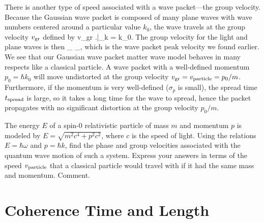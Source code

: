 There is another type of speed associated with a wave packet---the group velocity.  Because the Gaussian wave packet is composed of many plane waves with wave numbers centered around a particular value $k_{0}$, the wave travels at the group velocity $v_{\rm gr}$ defined by
%
\beq
v_{\rm gr} \equiv \left.\right|_{k = k_{0}}.
\label{group velocity}
\eeq
%
The group velocity for the light and plane waves is then
%
\beq
{}_{\displaystyle {}} \phantom{space} \longleftrightarrow  \phantom{space} _{\displaystyle {}},
\label{light matter group v}
\eeq
%
%
which is the wave packet peak velocity we found earlier. We see that our Gaussian wave packet matter wave model behaves in many respects like a classical particle.  A wave packet with a well-defined momentum $p_{0} = \hbar k_{0}$ will move undistorted at the group velocity $v_{\rm gr} = v_{\rm particle} = p_{0}/m$. Furthermore, if the momentum is very well-defined ($\sigma_{p}$ is small), the spread time $t_{\rm spread}$ is large, so it takes a long time for the wave to spread, hence the packet propagates with no significant distortion at the group velocity $p_{0}/m$.

\begin{exercise}
The energy $E$ of a spin-$0$ relativistic particle of mass $m$ and momentum $p$ is modeled by $E = \sqrt{m^{2}c^{4} + p^{2}c^{2}}$, where $c$ is the speed of light.  Using the relations $E = \hbar\omega$ and $p = \hbar k$, find the phase and group velocities associated with the quantum wave motion of such a system.  Express your answers in terms of the speed $v_{\rm particle}$ that a classical particle would travel with if it had the same mass and momentum.  Comment.
\end{exercise}

\section{Coherence Time and Length}

